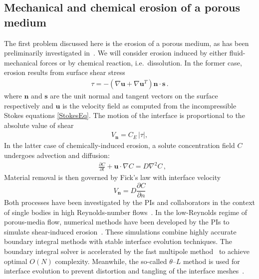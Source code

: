 \documentclass[11pt]{article}
\newcommand{\pd}[2]{ \frac{ \partial #1}{ \partial #2 } }
\newcommand{\bvec}[1]{{\mathbf{#1}}}
\newcommand{\grad}{\nabla}
\newcommand {\Lap} {\grad^2}
\newcommand{\abs}[1]{\left| #1 \right|}
\newcommand{\uu}{\bvec{u}}
\newcommand{\nn}{{\mathbf{n}}}
\renewcommand{\ss}{{\mathbf{s}}}
\newcommand{\Vn}{V_\nn}
\newcommand{\CE}{C_E}
\newcommand {\ny}{n}
\newcommand {\bdry} {\partial B}
\newcommand{\Diff}{D}
\newcommand{\thL}{$\theta$--$L$}
\begin{document}
\subsection{Mechanical and chemical erosion of a porous medium}

The first problem discussed here is the erosion of a porous medium, as has been preliminarily investigated in~\cite{Quaife2018}. We will consider erosion induced by either fluid-mechanical forces or by chemical reaction, i.e.~dissolution. In the former case, erosion results from surface shear stress
\begin{align}
\tau = -\left(\nabla \uu + \nabla \uu^T \right)\nn \cdot \ss \, .
\end{align}
where $\nn$ and $\ss$ are the unit normal and tangent vectors on the surface respectively and $\uu$ is the velocity field as computed from the incompressible Stokes equations \eqref{StokesEq}. 
The motion of the interface is proportional to the absolute value of shear
\begin{align}
\Vn = \CE \, \abs{\tau},
\end{align}
In the latter case of chemically-induced erosion, a solute concentration field $C$ undergoes advection and diffusion:
\begin{align}
\label{Ceq}
& \pd{C}{t} + \uu \cdot \grad C = \Diff \Lap C \, ,
\end{align}
Material removal is then governed by Fick's law with interface velocity
\begin{equation}
\label{DissVn}
\Vn = \left. \Diff \pd{C}{\ny} \right. %
\end{equation}
Both processes have been investigated by the PIs and collaborators in
the context of single bodies in high Reynolds-number
flows~\cite{Ristroph2012, MoorePOF2013, HuangJFM2015, MooreCPAM2017}. In
the low-Reynolds regime of porous-media flow, numerical methods have
been developed by the PIs to simulate shear-induced
erosion~\cite{Quaife2018}. These simulations combine highly accurate
boundary integral methods with stable interface evolution techniques.
The boundary integral solver is accelerated by the fast multipole
method~\cite{gre-rok1987, gre-gre-may1992} to achieve optimal $O(N)$
complexity. Meanwhile, the so-called {\thL} method is used for interface
evolution to prevent distortion and tangling of the interface meshes~\cite{hou1994removing, MoorePOF2013, Quaife2018}.
\end{document}
